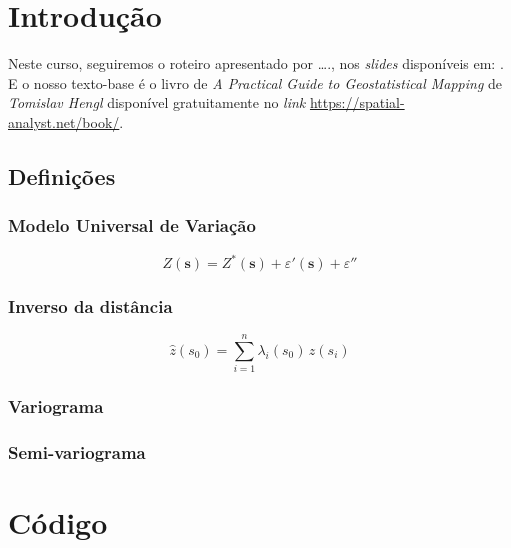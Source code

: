 \documentclass[
]{book}
\theoremstyle{definition}
\theoremstyle{definition}
\theoremstyle{definition}
\theoremstyle{definition}
\theoremstyle{remark}
\begin{document}
\hypertarget{introduuxe7uxe3o}{%
\chapter{Introdução}\label{introduuxe7uxe3o}}

Neste curso, seguiremos o roteiro apresentado por \ldots., nos \emph{slides} disponíveis em: \href{}{}. E o nosso texto-base é o livro de \emph{A Practical Guide to Geostatistical Mapping} de \emph{Tomislav Hengl} disponível gratuitamente no \emph{link} \url{https://spatial-analyst.net/book/}.

\hypertarget{definiuxe7uxf5es}{%
\section{Definições}\label{definiuxe7uxf5es}}

\hypertarget{modelo-universal-de-variauxe7uxe3o}{%
\subsection*{Modelo Universal de Variação}\label{modelo-universal-de-variauxe7uxe3o}}

\[Z(\mathbf{s}) = Z^{*}(\mathbf{s}) + \varepsilon'(\mathbf{s}) + \varepsilon''\]

\hypertarget{inverso-da-distuxe2ncia}{%
\subsection*{Inverso da distância}\label{inverso-da-distuxe2ncia}}

\[\hat{z}(s_ 0) = \sum_{i=1}^{n} \lambda_i(s_0) \, z(s_ i) \]

\hypertarget{variograma}{%
\subsection*{Variograma}\label{variograma}}

\hypertarget{semi-variograma}{%
\subsection*{Semi-variograma}\label{semi-variograma}}

\hypertarget{codigo}{%
\chapter{Código}\label{codigo}}
\end{document}
